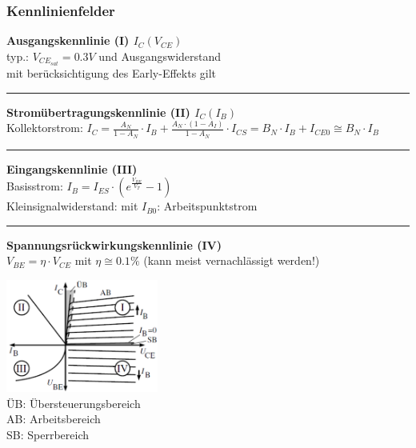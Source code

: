   \subsubsection{Kennlinienfelder}
    \begin{minipage}[T]{14cm}
      {\bf Ausgangskennlinie (I) $I_C(V_{CE})$}\\
      typ.: $V_{CE_{sat}}=0.3V$ und Ausgangswiderstand \\
      mit berücksichtigung des Early-Effekts gilt 
      \hrule\vspace{1mm}
      {\bf Strom\"ubertragungskennlinie (II) $I_C(I_B)$}\\
      Kollektorstrom: $I_C = \frac{A_N}{1-A_N}\cdot I_B + \frac{A_N\cdot (1-A_I)}{1-A_N}\cdot I_{CS} = B_N\cdot I_B + I_{CE0} \cong B_N\cdot I_B$\\
      \hrule\vspace{1mm}
      {\bf Eingangskennlinie (III)}\\
      Basisstrom: $I_B = I_{ES}\cdot\left(e^{\frac{V_{BE}}{V_T}}-1\right)$\\
      Kleinsignalwiderstand:  mit $I_{B0}$: Arbeitspunktstrom\\
      \hrule\vspace{1mm}
      {\bf Spannungsr\"uckwirkungskennlinie (IV)}\\
      $V_{BE} = \eta \cdot V_{CE}$ mit $\eta \cong 0.1 \%$ (kann meist vernachl\"assigt werden!)\\
    \end{minipage}
    \begin{minipage}[T]{5cm}
      \includegraphics[width=5cm]{./bilder/BipTraKennlinien.png}\\
      ÜB: Übersteuerungsbereich\\
      AB: Arbeitsbereich\\
      SB: Sperrbereich
    \end{minipage}
    



